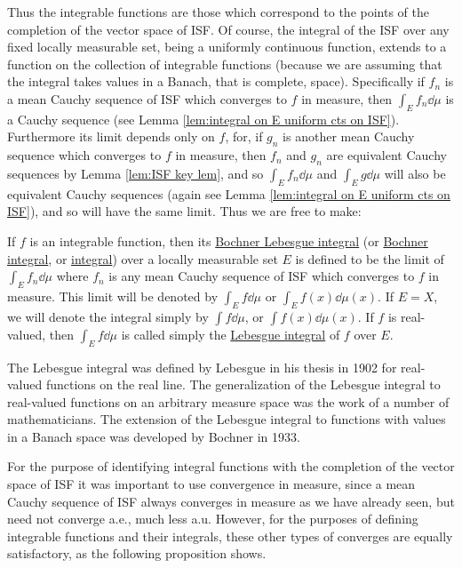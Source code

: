 Thus the integrable functions are those which correspond to the points of the completion of the vector space of ISF. Of course, the integral of the ISF over any fixed locally measurable set, being a uniformly continuous function, extends to a function on the collection of integrable functions (because we are assuming that the integral takes values in a Banach, that is complete, space). Specifically if $f_n$ is a mean Cauchy sequence of ISF which converges to $f$ in measure, then $\int_Ef_n\dd\mu$ is a Cauchy sequence (see Lemma \ref{lem:integral on E uniform cts on ISF}). Furthermore its limit depends only on $f$, for, if $g_n$ is another mean Cauchy sequence which converges to $f$ in measure, then $f_n$ and $g_n$ are equivalent Cauchy sequences by Lemma \ref{lem:ISF key lem}, and so $\int_Ef_n\dd\mu$ and $\int_Eg\dd\mu$ will also be equivalent Cauchy sequences (again see Lemma \ref{lem:integral on E uniform cts on ISF}), and so will have the same limit. Thus we are free to make:

\begin{definition}
If $f$ is an integrable function, then its \underline{Bochner Lebesgue integral} (or \underline{Bochner integral}, or \underline{integral}) over a locally measurable set $E$ is defined to be the limit of $\int_Ef_n\dd\mu$ where $f_n$ is any mean Cauchy sequence of ISF which converges to $f$ in measure. This limit will be denoted by $\int_Ef\dd\mu$ or $\int_Ef(x)\dd\mu(x)$. If $E=X$, we will denote the integral simply by $\int f\dd\mu$, or $\int f(x)\dd\mu(x)$. If $f$ is real-valued, then $\int_Ef\dd\mu$ is called simply the \underline{Lebesgue integral} of $f$ over $E$.
\end{definition}

The Lebesgue integral was defined by Lebesgue in his thesis in 1902 for real-valued functions on the real line. The generalization of the Lebesgue integral to real-valued functions on an arbitrary measure space was the work of a number of mathematicians. The extension of the Lebesgue integral to functions with values in a Banach space was developed by Bochner in 1933.

For the purpose of identifying integral functions with the completion of the vector space of ISF it was important to use convergence in measure, since a mean Cauchy sequence of ISF always converges in measure as we have already seen, but need not converge a.e., much less a.u. However, for the purposes of defining integrable functions and their integrals, these other types of converges are equally satisfactory, as the following proposition shows.

